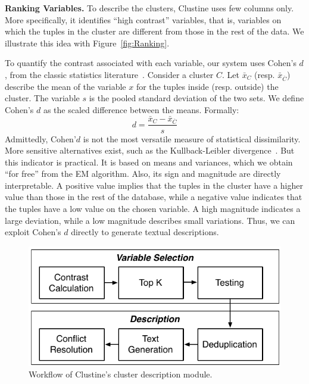 \textbf{Ranking Variables.} To describe the clusters, Clustine uses few columns
only. More specifically, it identifies ``high contrast'' variables, that is, variables
on which the tuples in the cluster are different from those in the rest of the
data. We illustrate this idea with Figure~\ref{fig:Ranking}.  

To quantify the contrast associated with each variable, our system uses Cohen's
$d$, from the classic statistics literature~\cite{cohen1977statistical}.
Consider a cluster $C$. Let $\bar{x}_C$ (resp.  $\bar{x}_{\overline{C}}$)
describe the mean of the variable $x$ for the tuples inside (resp. outside)
the cluster.  The variable $s$ is the pooled standard deviation of the two
sets. We define Cohen's $d$ as the scaled difference between the means.
Formally:
$$
d = \frac{\bar{x}_C -\bar{x}_{\overline{C}}}{s}
$$
Admittedly, Cohen'$d$ is not the most versatile measure of statistical
dissimilarity. More sensitive alternatives exist, such as the Kullback-Leibler
divergence~\cite{bishop2001bishop}.  But this indicator is practical.
It is based on means and variances, which we obtain ``for free''
from the EM algorithm. Also, its sign and magnitude are directly interpretable. A
positive value implies that the tuples in the cluster have a higher value than
those in the rest of the database, while a negative value indicates that the
tuples have a low value on the chosen variable. A high magnitude indicates a
large deviation, while a low magnitude describes small variations. Thus,
we can exploit Cohen's $d$ directly to generate textual descriptions.

\begin{figure}[t!]
  \centering
  \includegraphics[width=.7\columnwidth]{Explanations}
  \caption{Workflow of Clustine's cluster description module.}
  \label{fig:descriptions}
\end{figure}

